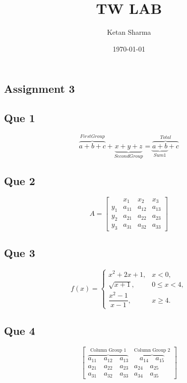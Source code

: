 \documentclass[12pt,a4paper]{article}
\title{TW LAB}
\author{Ketan Sharma}
\date{\today}
\begin{document}
	\maketitle
	\begin{center}
		\section*{Assignment 3}
	\end{center}
	\vspace{0.5cm}
	
	\subsection*{Que 1}
	
	\[
	\overbrace{a+b+c}^{First Group}+\underbrace{x+y+z}_{Second Group}=\overbrace{\underbrace{a+b}_{Sum 1}+c}^{Total}
	\]
	
	\subsection*{Que 2}
	
	\[
	A=
	\left[
	\begin{array}{c|ccc}
		& x_1 & x_2 & x_3\\
		\hline
		y_1 & a_{11} & a_{12} & a_{13}\\
		y_2 & a_{21} & a_{22} & a_{23}\\
		y_3 & a_{31} & a_{32} & a_{33}
	\end{array}
	\right]
	\]
	
	\subsection*{Que 3}
	
	\[
	f(x)=
	\begin{cases}
		x^2+2x+1, & x<0,\\
		\sqrt{x+1}, & 0\leq x<4,\\
		\dfrac{x^2-1}{x-1}, & x\geq4.
	\end{cases}
	\]
	
	\subsection*{Que 4}
	
	\[
	\left[
	\begin{array}{ccccc}
		\overbrace{a_{11}\quad a_{12}\quad a_{13}}^{\text{Column Group 1}} &
		\overbrace{a_{14}\quad a_{15}}^{\text{Column Group 2}}\\
		a_{21}\quad a_{22}\quad a_{23}&a_{24}\quad a_{25}\\
		a_{31}\quad a_{32}\quad a_{33}&a_{34}\quad a_{35}
	\end{array}
	\right]
	\]
	
\end{document}
